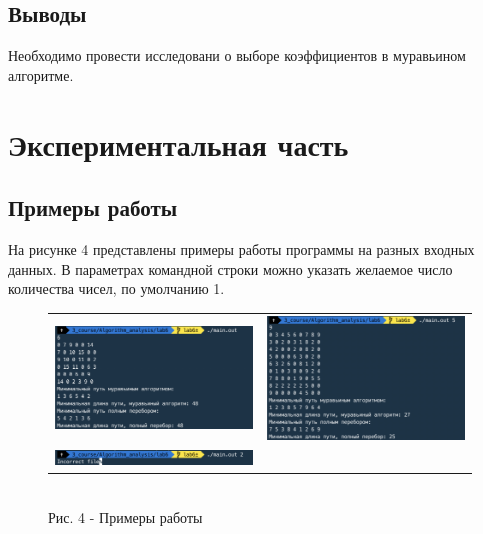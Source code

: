 \documentclass[a4paper,14pt]{article} %
\begin{document}
 	\subsection{Выводы}
	\hfill
	
	Необходимо провести исследовани о выборе коэффициентов в муравьином алгоритме. 
	
	        
        \newpage
        

        \section{Экспериментальная часть}
        \hfill
        
       
        \subsection{Примеры работы}
	\hfill
	
	На рисунке 4 представлены примеры работы программы на разных входных данных. В параметрах командной строки можно указать желаемое число количества чисел, по умолчанию 1.
	\begin{figure}[h]\center
		\begin{tabular}{cc}
			\includegraphics[width=80mm]{ex1} & \includegraphics[width=80mm]{ex2} \\
			\includegraphics[width=80mm]{ex3}
		\end{tabular}
		\\ Рис. 4 - Примеры работы
	\end{figure}
	
\end{document}
